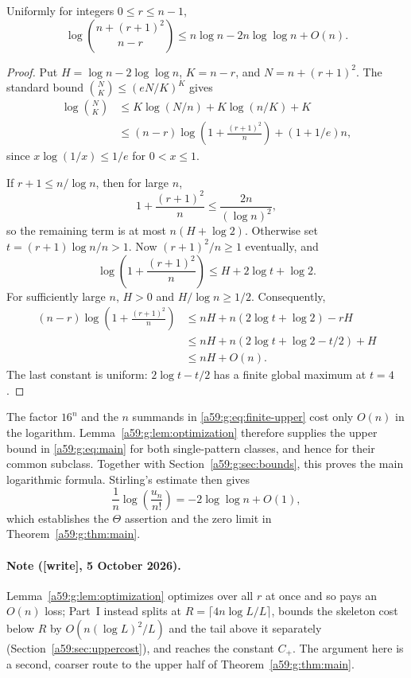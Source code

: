 \documentclass[11pt,letterpaper]{article}
\theoremstyle{remark}\newtheorem{remark}[theorem]{Remark}
\newcommand{\wtag}{\textup{[write]}}
\theoremstyle{remark}\newtheorem{wremark}{Remark}\renewcommand{\thewremark}{W\arabic{wremark}}
\theoremstyle{plain}\newtheorem{wcorollary}[wremark]{Corollary}
\begin{document}
\begin{lemma}\label{a59:g:lem:optimization}
Uniformly for integers $0\leq r\leq n-1$,
\begin{equation}\label{a59:g:eq:optimized}
 \log\binom{n+(r+1)^2}{n-r}
 \leq n\log n-2n\log\log n+O(n).
\end{equation}
\end{lemma}
\begin{proof}
Put $H=\log n-2\log\log n$, $K=n-r$, and $N=n+(r+1)^2$. The standard bound $\binom NK\leq(eN/K)^K$ gives
\begin{align*}
 \log\binom NK
 &\leq K\log(N/n)+K\log(n/K)+K\\
 &\leq(n-r)\log\!\left(1+\frac{(r+1)^2}{n}\right)+(1+1/e)n,
\end{align*}
since $x\log(1/x)\leq1/e$ for $0<x\leq1$.

If $r+1\leq n/\log n$, then for large $n$,
\[
 1+\frac{(r+1)^2}{n}\leq\frac{2n}{(\log n)^2},
\]
so the remaining term is at most $n(H+\log2)$. Otherwise set $t=(r+1)\log n/n>1$. Now $(r+1)^2/n\geq1$ eventually, and
\[
 \log\!\left(1+\frac{(r+1)^2}{n}\right)\leq H+2\log t+\log2.
\]
For sufficiently large $n$, $H>0$ and $H/\log n\geq1/2$. Consequently,
\begin{align*}
 (n-r)\log\!\left(1+\frac{(r+1)^2}{n}\right)
 &\leq nH+n(2\log t+\log2)-rH\\
 &\leq nH+n(2\log t+\log2-t/2)+H\\
 &\leq nH+O(n).
\end{align*}
The last constant is uniform: $2\log t-t/2$ has a finite global maximum at $t=4$.
\end{proof}

The factor $16^n$ and the $n$ summands in \eqref{a59:g:eq:finite-upper} cost only $O(n)$ in the logarithm. Lemma~\ref{a59:g:lem:optimization} therefore supplies the upper bound in \eqref{a59:g:eq:main} for both single-pattern classes, and hence for their common subclass. Together with Section~\ref{a59:g:sec:bounds}, this proves the main logarithmic formula. Stirling's estimate then gives
\[
 \frac1n\log\left(\frac{u_n}{n!}\right)
   =-2\log\log n+O(1),
\]
which establishes the $\Theta$ assertion and the zero limit in Theorem~\ref{a59:g:thm:main}.

\paragraph{Note (\wtag, 5 October 2026).} Lemma~\ref{a59:g:lem:optimization}
optimizes over all $r$ at once and so pays an $O(n)$ loss; Part~I instead
splits at $R=\lceil4n\log L/L\rceil$, bounds the skeleton cost below $R$ by
$O(n(\log L)^2/L)$ and the tail above it separately
(Section~\ref{a59:sec:uppercost}), and reaches the constant $C_+$. The
argument here is a second, coarser route to the upper half of
Theorem~\ref{a59:g:thm:main}.
\end{document}
